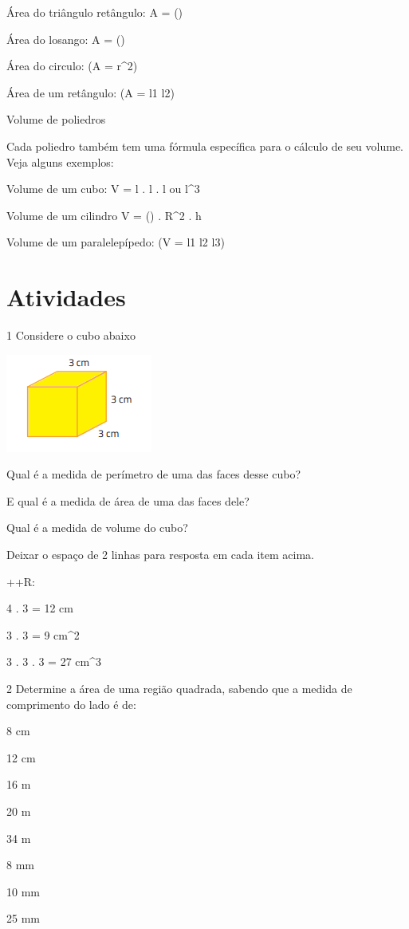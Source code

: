 {Área do triângulo retângulo: A = ()

Área do losango: A = ()

Área do circulo: (A = \pi r^{2})

Área de um retângulo: (A = l1 \times l2)

Volume de poliedros

Cada poliedro também tem uma fórmula específica para o cálculo de seu
volume. Veja alguns exemplos:

Volume de um cubo: V = l . l . l ou l^3

Volume de um cilindro V = (\Pi) . R^2 . h

Volume de um paralelepípedo: (V = l1 \times l2 \times l3)

\section{Atividades}

\num{1} Considere o cubo abaixo

\includegraphics[width=1.89583in,height=1.27083in]{./imgSAEB_8_MAT/media/image42.png}
\item Qual é a medida de perímetro de uma das faces desse cubo?
\item E qual é a medida de área de uma das faces dele?
\item Qual é a medida de volume do cubo?

Deixar o espaço de 2 linhas para resposta em cada item acima.

++R:
\item 4 . 3 = 12 cm
\item 3 . 3 = 9 cm^2
\item 3 . 3 . 3 = 27 cm^3

\num{2} Determine a área de uma região quadrada, sabendo que a medida de
comprimento do lado é de:
\item 8 cm
\item 12 cm
\item 16 m
\item 20 m
\item 34 m
\item 8 mm
\item 10 mm
\item 25 mm

}
